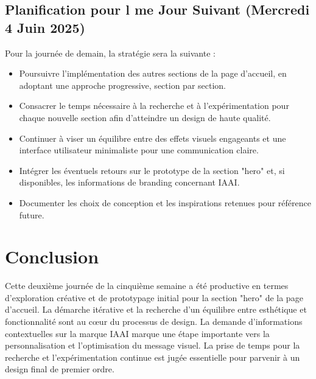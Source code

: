 \documentclass[12pt, a4paper]{article}
\begin{document}
\subsection{Planification pour l me Jour Suivant (Mercredi 4 Juin 2025)}
Pour la journée de demain, la stratégie sera la suivante :
\begin{itemize}
  \item Poursuivre l'implémentation des autres sections de la page d'accueil, en adoptant une approche progressive, section par section.
  \item Consacrer le temps nécessaire à la recherche et à l'expérimentation pour chaque nouvelle section afin d'atteindre un design de haute qualité.
  \item Continuer à viser un équilibre entre des effets visuels engageants et une interface utilisateur minimaliste pour une communication claire.
  \item Intégrer les éventuels retours sur le prototype de la section "hero" et, si disponibles, les informations de branding concernant IAAI.
  \item Documenter les choix de conception et les inspirations retenues pour référence future.
\end{itemize}

\section{Conclusion}
Cette deuxième journée de la cinquième semaine a été productive en termes d'exploration créative et de prototypage initial pour la section "hero" de la page d'accueil. La démarche itérative et la recherche d'un équilibre entre esthétique et fonctionnalité sont au cœur du processus de design. La demande d'informations contextuelles sur la marque IAAI marque une étape importante vers la personnalisation et l'optimisation du message visuel. La prise de temps pour la recherche et l'expérimentation continue est jugée essentielle pour parvenir à un design final de premier ordre.
\end{document}
